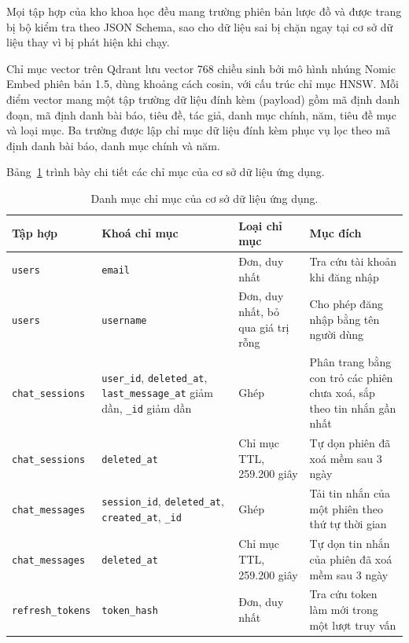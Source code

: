 Mọi tập hợp của kho khoa học đều mang trường phiên bản lược đồ và được trang bị bộ kiểm tra theo JSON Schema, sao cho dữ liệu sai bị chặn ngay tại cơ sở dữ liệu thay vì bị phát hiện khi chạy.

Chỉ mục vector trên Qdrant lưu vector 768 chiều sinh bởi mô hình nhúng Nomic Embed phiên bản 1.5, dùng khoảng cách cosin, với cấu trúc chỉ mục HNSW. Mỗi điểm vector mang một tập trường dữ liệu đính kèm (payload) gồm mã định danh đoạn, mã định danh bài báo, tiêu đề, tác giả, danh mục chính, năm, tiêu đề mục và loại mục. Ba trường được lập chỉ mục dữ liệu đính kèm phục vụ lọc theo mã định danh bài báo, danh mục chính và năm.

Bảng~\ref{tab:chi-muc-csdl-ung-dung} trình bày chi tiết các chỉ mục của cơ sở dữ liệu ứng dụng.

\begin{table}[htbp]
    \centering
    \caption{Danh mục chỉ mục của cơ sở dữ liệu ứng dụng.}
    \label{tab:chi-muc-csdl-ung-dung}
    \footnotesize
    \begin{tabularx}{\textwidth}{@{}>{\raggedright\arraybackslash}p{3.2cm}>{\raggedright\arraybackslash}p{4.1cm}>{\raggedright\arraybackslash}p{2.8cm}>{\raggedright\arraybackslash}X@{}}
        \toprule
        \textbf{Tập hợp} & \textbf{Khoá chỉ mục} & \textbf{Loại chỉ mục} & \textbf{Mục đích} \\
        \midrule
        \texttt{users} & \texttt{email} & Đơn, duy nhất & Tra cứu tài khoản khi đăng nhập \\
        \texttt{users} & \texttt{username} & Đơn, duy nhất, bỏ qua giá trị rỗng & Cho phép đăng nhập bằng tên người dùng \\
        \texttt{chat\_sessions} & \texttt{user\_id}, \texttt{deleted\_at}, \texttt{last\_message\_at} giảm dần, \texttt{\_id} giảm dần & Ghép & Phân trang bằng con trỏ các phiên chưa xoá, sắp theo tin nhắn gần nhất \\
        \texttt{chat\_sessions} & \texttt{deleted\_at} & Chỉ mục TTL, 259.200 giây & Tự dọn phiên đã xoá mềm sau 3 ngày \\
        \texttt{chat\_messages} & \texttt{session\_id}, \texttt{deleted\_at}, \texttt{created\_at}, \texttt{\_id} & Ghép & Tải tin nhắn của một phiên theo thứ tự thời gian \\
        \texttt{chat\_messages} & \texttt{deleted\_at} & Chỉ mục TTL, 259.200 giây & Tự dọn tin nhắn của phiên đã xoá mềm sau 3 ngày \\
        \texttt{refresh\_tokens} & \texttt{token\_hash} & Đơn, duy nhất & Tra cứu token làm mới trong một lượt truy vấn \\

\end{tabularx}
\end{table}
